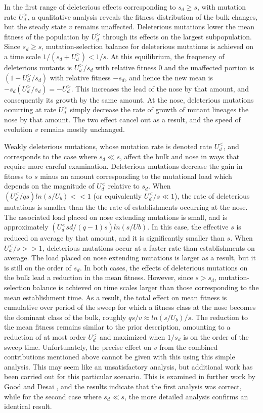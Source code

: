 \documentclass[12pt]{article}
\begin{document}
In the first range of deleterious effects corresponding to $s_d \geq s$, with mutation rate $U_d^{>}$, a qualitative analysis reveals the fitness distribution of the bulk changes, but the steady state $v$ remains unaffected.  Deleterious mutations lower the mean fitness of the population by $U_d^{>}$ through its effects on the largest subpopulation.  Since $s_d \geq s$, mutation-selection balance for deleterious mutations is achieved on a time scale $1/(s_d +U_d^{>}) < 1/s$.  At this equilibrium, the frequency of deleterious mutants is $U_d^{>}/s_d$ with relative fitness $0$ and the unaffected portion is $(1-U_d^{>}/s_d)$ with relative fitness $-s_d$, and hence the new mean is $-s_d (U_d^{>}/s_d) = -U_d^{>}$.  This increases the lead of the nose by that amount, and consequently its growth by the same amount.  At the nose, deleterious mutations occurring at rate $U_d^{>}$ simply decrease the rate of growth of mutant lineages the nose by that amount.  The two effect cancel out as a result, and the speed of evolution $v$ remains mostly unchanged.

Weakly deleterious mutations, whose mutation rate is denoted rate $U_d^{<}$, and corresponds to the case where $s_d \ll s$, affect the bulk and nose  in ways that require more careful examination.  Deleterious mutations decrease the gain in fitness to $s$ minus an amount corresponding to the mutational load which depends on the magnitude of $U_d^{<}$ relative to $s_d$.  When $(U_d^{<} / qs)ln(s/U_b) <<1$ (or equivalently $U_d^{<}/s \ll 1$), the rate of deleterious mutations is smaller than the the rate of establishments occurring at the nose.  The associated load placed on nose extending mutations is small, and is approximately $(U_d^{<} sd /(q-1)s)ln(s/Ub)$.  In this case, the effective $s$ is reduced on average by that amount, and it is significantly smaller than $s$.  When $U_d^{<} / s >> 1 $, deleterious mutations occur at a faster rate than establishments on average.  The load placed on nose extending mutations is larger as a result, but it is still on the order of $s_d$.  In both cases, the  effects of deleterious mutations on the bulk lead a reduction in the mean fitness.  However, since $s> s_d$, mutation-selection balance is achieved on time scales larger than those corresponding to the mean establishment time.  As a result, the total effect on mean fitness is cumulative over period of the sweep for which a fitness class at the nose becomes the dominant class of the bulk, roughly $qs/v \approx ln(s/U_b)/s$.  The reduction to the mean fitness remains similar to the prior description, amounting to a reduction of at most order $U_d^{<}$ and maximized when $1/s_d$ is on the order of the sweep time.  Unfortunately, the precise effect on $v$ from the combined contributions mentioned above cannot be given with this using this simple analysis.  This may seem like an unsatisfactory analysis, but additional work has been carried out for this particular scenario.  This is examined in further work by Good and Desai \cite{GoodDesai12}, and the results indicate that the first analysis was correct, while for the second case where $s_d \ll s$, the more detailed analysis confirms an identical result.
\end{document}
